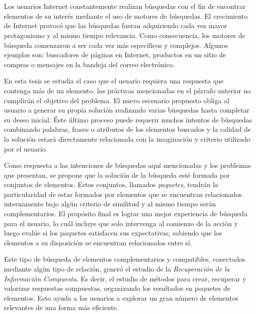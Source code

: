 \chapter*{\runtitulo}

\noindent 

Los usuarios Internet constantemente realizan búsquedas con el fin de encontrar elementos de su interés mediante el uso de motores de búsquedas. El crecimiento de Internet provocó que las búsquedas fueran adquiriendo cada vez mayor protagonismo y al mismo tiempo relevancia. Como consecuencia, los motores de búsqueda comenzaron a ser cada vez más específicos y complejos. Algunos ejemplos son: buscadores de páginas en Internet, productos en un sitio de compras o mensajes en la bandeja del correo electrónico.

En esta tesis se estudia el caso que el usuario requiera una respuesta que contenga más de un elemento, las prácticas mencionadas en el párrafo anterior no cumplirán el objetivo del problema. El nuevo escenario propuesto obliga al usuario a generar su propia solución realizando varias búsquedas hasta completar su deseo inicial. Éste último proceso puede requerir muchos intentos de búsquedas combinando palabras, frases o atributos de los elementos buscados y la calidad de la solución estará directamente relacionada con la imaginación y criterio utilizado por el usuario.

Como respuesta a las intenciones de búsquedas aquí mencionadas y los problemas que presentan, se propone que la solución de la búsqueda esté formada por conjuntos de elementos. Estos conjuntos, llamados {\em paquetes}, tendrán la particularidad de estar formados por elementos que se encuentran relacionados internamente bajo algún criterio de similitud y al mismo tiempo serán complementarios. El propósito final es lograr una mejor experiencia de búsqueda para el usuario, lo cuál incluye que solo intervenga al comienzo de la acción y luego evalúe si los paquetes satisfacen sus expectativas, sabiendo que los elementos a su disposición se encuentran relacionados entre sí.

Este tipo de búsqueda de elementos complementarios y compatibles, conectados mediante algún tipo de relación, generó el estudio de la {\em Recuperación de la Información Compuesta}. Es decir, el estudio de métodos para crear, recuperar y valorizar respuestas compuestas, organizando los resultados en paquetes de elementos. Esto ayuda a los usuarios a explorar un gran número de elementos relevantes de una forma más eficiente.

